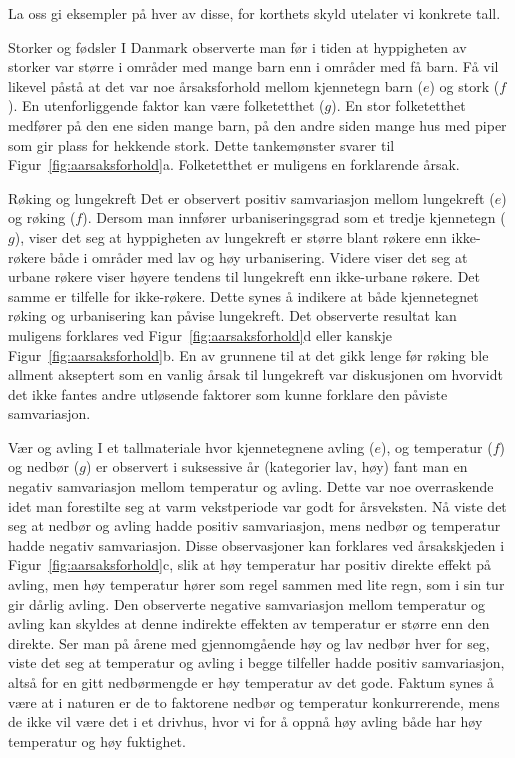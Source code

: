 La oss gi eksempler på hver av disse, for korthets skyld utelater
vi konkrete tall.\\


\begin{eksempel}{Storker og fødsler}
I Danmark observerte man før i tiden at hyppigheten av storker var
større i områder med mange barn enn i områder med få barn.
Få vil likevel påstå at det var noe årsaksforhold mellom
kjennetegn barn ($e$) og stork ($f$).  En utenforliggende faktor kan
være folketetthet ($g$). En stor folke\-tett\-het medfører på
den ene siden mange barn, på den andre siden mange hus med piper
som gir plass for hekkende stork.  Dette tankemønster svarer til
Figur~\ref{fig:aarsaksforhold}a.  Folketetthet er muligens en forklarende årsak.
\end{eksempel}

\begin{eksempel}{Røking og lungekreft}
Det er observert positiv samvariasjon mellom lungekreft ($e$) og 
røking ($f$).  Dersom man innfører urbaniseringsgrad som et tredje
kjennetegn ($g$), viser det seg at hyppigheten av lungekreft er større
blant røkere enn ikke-røkere både i områder med lav og høy
urbanisering.  Videre viser det seg at urbane røkere viser høyere
tendens til lungekreft enn ikke-urbane røkere.  Det samme er tilfelle
for ikke-røkere.  Dette synes å indikere at både kjennetegnet
røking og urbanisering kan påvise lungekreft.  Det observerte
resultat kan muligens forklares ved Figur~\ref{fig:aarsaksforhold}d eller 
kanskje Figur~\ref{fig:aarsaksforhold}b.  En
av grunnene til at det gikk lenge før røking ble allment akseptert
som en vanlig årsak til lungekreft var diskusjonen om hvorvidt det
ikke fantes andre utløsende faktorer som kunne forklare den påviste
samvariasjon.
\end{eksempel}

\begin{eksempel}{Vær og avling}
I et tallmateriale hvor kjennetegnene avling ($e$), og temperatur ($f$)
og nedbør ($g$) er observert i suksessive år (kategorier lav, høy)
fant man en ne\-ga\-tiv samvariasjon mellom temperatur og avling.  Dette var
noe over\-raskende idet man forestilte seg at varm vekstperiode var godt
for årsveksten.  Nå viste det seg at nedbør og avling
hadde positiv samvariasjon, mens nedbør og temperatur hadde negativ
samvariasjon.  Disse observasjoner kan forklares ved årsakskjeden i
Figur~\ref{fig:aarsaksforhold}c, slik at høy temperatur har posi\-tiv direkte effekt på
avling, men høy temperatur hører som regel sammen med lite regn,
som i sin tur gir dårlig avling.  Den observerte negative samvariasjon
mellom temperatur og avling kan skyldes at denne indirekte effekten av
temperatur er større enn den direkte.  Ser man på årene med
gjennomgående høy og lav nedbør hver for seg, viste det seg
at tem\-pera\-tur og avling i begge tilfeller hadde positiv samvariasjon,
altså for en gitt nedbørmengde er høy temperatur av det gode.
Faktum synes å være at i naturen er de to faktorene nedbør
og temperatur konkurrerende, mens de ikke vil være det i et drivhus,
hvor vi for å oppnå høy avling både har høy
temperatur og høy fuktighet.
\end{eksempel}

